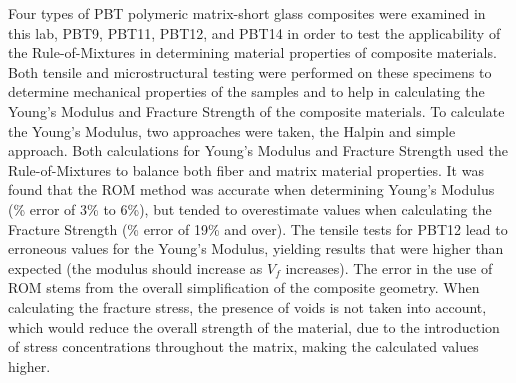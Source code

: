 \documentclass[11pt]{article}
\begin{document}
Four types of PBT polymeric matrix-short glass composites were examined in this lab, PBT9, PBT11, PBT12, and PBT14 in order to test the applicability of the Rule-of-Mixtures in determining material properties of composite materials. Both tensile and microstructural testing were performed on these specimens to determine mechanical properties of the samples and to help in calculating the Young's Modulus and Fracture Strength of the composite materials. To calculate the Young's Modulus, two approaches were taken, the Halpin and simple approach. Both calculations for Young's Modulus and Fracture Strength used the Rule-of-Mixtures to balance both fiber and matrix material properties. It was found that the ROM method was  accurate when determining Young's Modulus (\% error of 3\% to 6\%), but tended to overestimate values when calculating the Fracture Strength (\% error of 19\% and over). The tensile tests for PBT12 lead to erroneous values for the Young's Modulus, yielding results that were higher than expected (the modulus should increase as \(V_f\) increases).
\singlespacing
The error in the use of ROM stems from the overall simplification of the composite geometry. When calculating the fracture stress, the presence of voids is not taken into account, which would reduce the overall strength of the material, due to the introduction of stress concentrations throughout the matrix, making the calculated values higher. 
\end{document}
